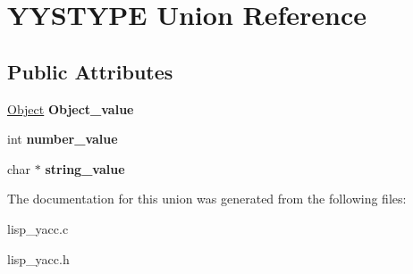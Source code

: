\hypertarget{unionYYSTYPE}{\section{Y\-Y\-S\-T\-Y\-P\-E Union Reference}
\label{unionYYSTYPE}
}
\subsection*{Public Attributes}
\begin{DoxyCompactItemize}
\item 
\hypertarget{unionYYSTYPE_ad89069baa0a35ece66a52b315835abe6}{\hyperlink{classCell}{Object} {\bfseries Object\-\_\-value}}\label{unionYYSTYPE_ad89069baa0a35ece66a52b315835abe6}

\item 
\hypertarget{unionYYSTYPE_a85e325a8c56800cb3c763fb0aae89b28}{int {\bfseries number\-\_\-value}}\label{unionYYSTYPE_a85e325a8c56800cb3c763fb0aae89b28}

\item 
\hypertarget{unionYYSTYPE_ac01a27ce7f2f4974d8b55b4ba00429a0}{char $\ast$ {\bfseries string\-\_\-value}}\label{unionYYSTYPE_ac01a27ce7f2f4974d8b55b4ba00429a0}

\end{DoxyCompactItemize}


The documentation for this union was generated from the following files\-:\begin{DoxyCompactItemize}
\item 
lisp\-\_\-yacc.\-c\item 
lisp\-\_\-yacc.\-h\end{DoxyCompactItemize}
